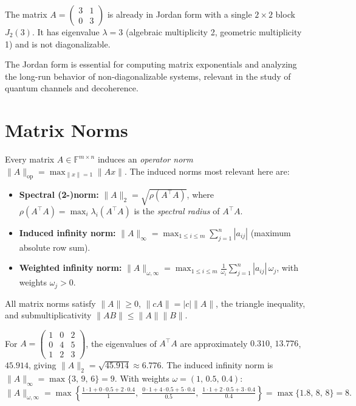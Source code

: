 \begin{example}
The matrix $A=\begin{pmatrix}3&1\\0&3\end{pmatrix}$ is already in Jordan form with a single $2\times2$ block $J_2(3)$. It has eigenvalue $\lambda=3$ (algebraic multiplicity 2, geometric multiplicity 1) and is not diagonalizable.
\end{example}

The Jordan form is essential for computing matrix exponentials and analyzing the long-run behavior of non-diagonalizable systems, relevant in the study of quantum channels and decoherence.

\section{Matrix Norms}

Every matrix $A\in\mathbb{F}^{m\times n}$ induces an \emph{operator norm} $\|A\|_{\mathrm{op}} = \max_{\|x\|=1}\|Ax\|$. The induced norms most relevant here are:
\begin{itemize}
  \item \textbf{Spectral (2-)norm:} $\displaystyle\|A\|_2 = \sqrt{\rho(A^\top A)}$, where $\rho(A^\top A) = \max_i\lambda_i(A^\top A)$ is the \emph{spectral radius} of $A^\top A$.
  \item \textbf{Induced infinity norm:} $\displaystyle\|A\|_\infty = \max_{1\le i\le m}\sum_{j=1}^n |a_{ij}|$ (maximum absolute row sum).
  \item \textbf{Weighted infinity norm:} $\displaystyle\|A\|_{\omega,\infty} = \max_{1\le i\le m}\frac{1}{\omega_i}\sum_{j=1}^n |a_{ij}|\,\omega_j$, with weights $\omega_j>0$.
\end{itemize}

All matrix norms satisfy $\|A\|\ge0$, $\|cA\|=|c|\|A\|$, the triangle inequality, and submultiplicativity $\|AB\|\le\|A\|\|B\|$.

\begin{example}
For $A=\begin{pmatrix}1&0&2\\0&4&5\\1&2&3\end{pmatrix}$, the eigenvalues of $A^\top A$ are approximately $0.310$, $13.776$, $45.914$, giving $\|A\|_2 = \sqrt{45.914}\approx 6.776$. The induced infinity norm is $\|A\|_\infty = \max\{3,\,9,\,6\}=9$. With weights $\omega=(1,\,0.5,\,0.4)$:
\[
  \|A\|_{\omega,\infty} = \max\!\left\{\tfrac{1{\cdot}1+0{\cdot}0.5+2{\cdot}0.4}{1},\;
  \tfrac{0{\cdot}1+4{\cdot}0.5+5{\cdot}0.4}{0.5},\;
  \tfrac{1{\cdot}1+2{\cdot}0.5+3{\cdot}0.4}{0.4}\right\} = \max\{1.8,\,8,\,8\}=8.
\]
\end{example}

